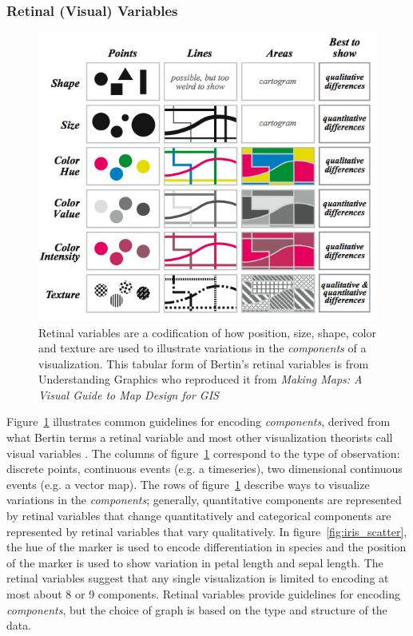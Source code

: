 \documentclass[letterpaper,onecolumn,titlepage]{Ythesis}
\begin{document}
\subsubsection{Retinal (Visual) Variables}
\begin{figure}[H]
\includegraphics[width=1\textwidth]{intro/retinal_variables.png}
\caption{Retinal variables are a codification of how position, size, shape, color and texture are used to illustrate variations in the \textit{components} of a visualization. This tabular form of Bertin's retinal variables is from Understanding Graphics \cite{_information_????} who reproduced it from \textit{Making Maps: A Visual Guide to Map Design for GIS} \cite{krygier_making_2005}}
\label{fig:retinal_variables}
\end{figure}

Figure~\ref{fig:retinal_variables} illustrates common guidelines for encoding \textit{components}, derived from what Bertin terms a retinal variable and most other visualization theorists call visual variables \cite{bertin_semiology_2011,krygier_making_2005,chambers_graphical_1983,wilkinson_grammar_2005,munzner_visualization_2014}. The columns of figure~\ref{fig:retinal_variables} correspond to the type of observation: discrete points, continuous events (e.g. a timeseries), two dimensional continuous events (e.g. a vector map). The rows of figure~\ref{fig:retinal_variables} describe ways to visualize variations in the \textit{components}; generally, quantitative components are represented by retinal variables that change quantitatively and categorical components are represented by retinal variables that vary qualitatively. In figure~\ref{fig:iris_scatter}, the hue of the marker is used to encode differentiation in species and the position of the marker is used to show variation in petal length and sepal length. The retinal variables suggest that any single visualization is limited to encoding at most about 8 or 9 components. Retinal variables provide guidelines for encoding \textit{components}, but the choice of graph is based on the type and structure of the data. 
\end{document}
